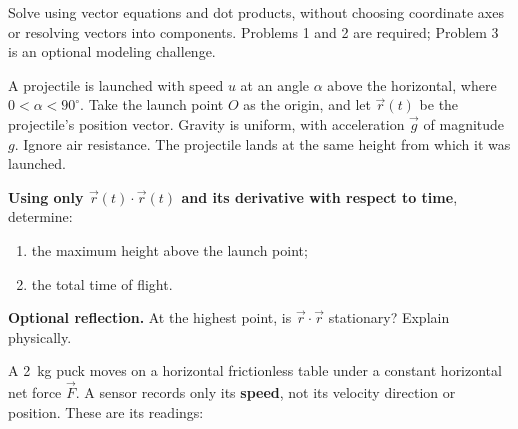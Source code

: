 \documentclass[11pt,a4paper]{article}
\begin{document}

Solve using vector equations and dot products, without choosing coordinate
axes or resolving vectors into components. Problems 1 and 2 are required;
Problem 3 is an optional modeling challenge.


A projectile is launched with speed $u$ at an angle $\alpha$ above the
horizontal, where $0<\alpha<90^\circ$. Take the launch point $O$ as the
origin, and let $\vec r(t)$ be the projectile's position vector.
Gravity is uniform, with acceleration $\vec g$ of magnitude $g$.
Ignore air resistance. The projectile lands at the same height from
which it was launched.

\begin{center} 
\end{center}

\textbf{Using only $\vec r(t)\cdot\vec r(t)$ and its derivative with
respect to time}, determine:
\begin{enumerate}[label=\alph*)]
  \item the maximum height above the launch point;
  \item the total time of flight.
\end{enumerate}

\textbf{Optional reflection.} At the highest point, is
$\vec r\cdot\vec r$ stationary? Explain physically.


\clearpage
{}

A \SI{2}{kg} puck moves on a horizontal frictionless table under a constant
horizontal net force $\vec F$. A sensor records only its \textbf{speed},
not its velocity direction or position. These are its readings:
\end{document}
